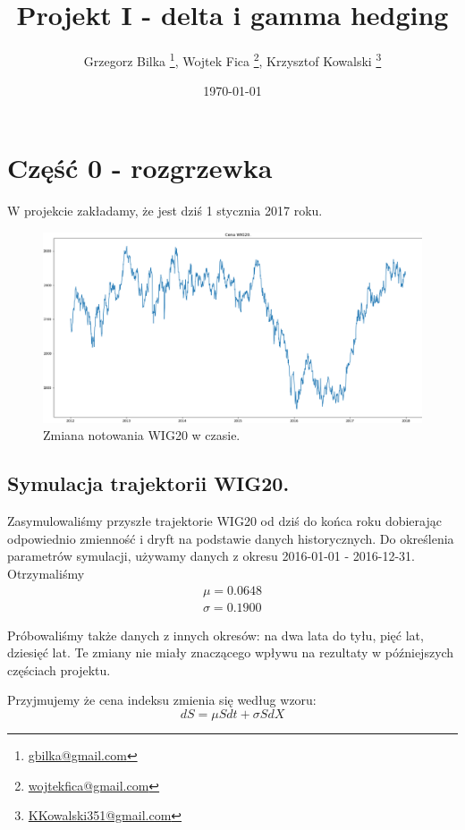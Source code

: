 \documentclass[12pt]{article}
\title{Projekt I - delta i gamma hedging}
\author{Grzegorz Bilka \footnote{\href{mailto:gbilka@gmail.com}{gbilka@gmail.com}}, Wojtek Fica \footnote{\href{mailto:wojtekfica@gmail.com}{wojtekfica@gmail.com}}, Krzysztof Kowalski \footnote{\href{mailto:KKowalski351@gmail.com}{KKowalski351@gmail.com}}}
\date{\today}
\begin{document}
\maketitle

\section{Część 0 - rozgrzewka}
W projekcie zakładamy, że jest dziś 1 stycznia 2017 roku. 

\begin{figure}[htp]
    \centering
    \includegraphics[width=\textwidth,height=\textheight,keepaspectratio]{wig20_cena.png}
    \caption{Zmiana notowania WIG20 w czasie.}
    \label{fig:cena_wig20}
\end{figure}

\subsection{Symulacja trajektorii WIG20.}

Zasymulowaliśmy przyszłe trajektorie WIG20 od dziś do końca roku dobierając odpowiednio zmienność i dryft na podstawie danych historycznych. Do określenia parametrów symulacji, używamy danych z okresu 2016-01-01 - 2016-12-31. Otrzymaliśmy 
\begin{align*}
\mu = 0.0648 \\ 
\sigma = 0.1900    
\end{align*}

Próbowaliśmy także danych z innych okresów: na dwa lata do tyłu, pięć lat, dziesięć lat. Te zmiany nie miały znaczącego wpływu na rezultaty w późniejszych częściach projektu.

Przyjmujemy że cena indeksu zmienia się według wzoru:
$$ dS = \mu S dt  + \sigma S dX $$
\end{document}
